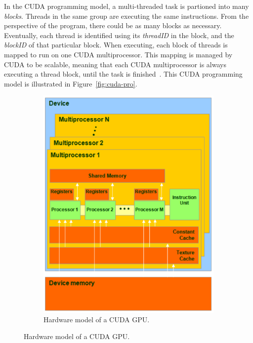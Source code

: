 In the CUDA programming model, a multi-threaded task is partioned into 
many \textit{blocks}.
%
Threads in the same group are executing the same instructions.
%
From the perspective of the program, there could be as many blocks
as necessary.
%
Eventually, each thread is identified using its \textit{threadID} in 
the block, and the \textit{blockID} of that particular block.
%
When executing, each block of threads is mapped to run on one CUDA 
multiprocessor. 
%
This mapping is managed by CUDA to be scalable, meaning that each CUDA 
multiprocessor is always executing a thread block, until the task
is finished~\cite{cudaprogramming}.
%
This CUDA programming model is illustrated in Figure~\ref{fig:cuda-pro}.



\begin{figure}
    \centering
    \begin{subfigure}[b]{0.46\textwidth}
                \includegraphics[width=\textwidth]{fig/cuda-hw.png}
                \caption{Hardware model of a CUDA GPU. 
}
\end{subfigure}
\end{figure}
